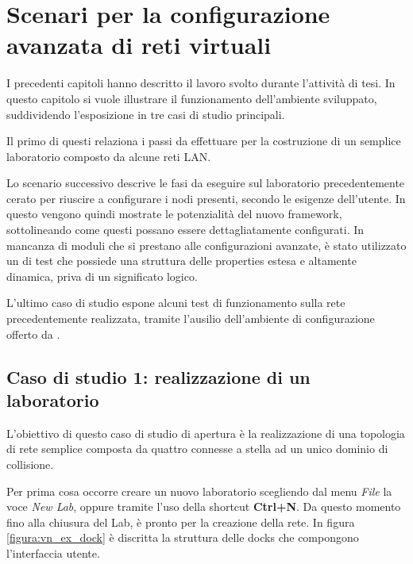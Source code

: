 \chapter{Scenari per la configurazione avanzata di reti virtuali}\label{capitolo:esempi}

I precedenti capitoli hanno descritto il lavoro svolto durante l'attività di tesi. In questo capitolo si vuole illustrare il funzionamento dell'ambiente sviluppato, suddividendo l'esposizione in tre casi di studio principali.

Il primo di questi relaziona i passi da effettuare per la costruzione di un semplice laboratorio composto da alcune reti LAN.

Lo scenario successivo descrive le fasi da eseguire sul laboratorio precedentemente cerato per riuscire a configurare i nodi presenti, secondo le esigenze dell'utente. In questo vengono quindi mostrate le potenzialità del nuovo \plugin{} framework, sottolineando come questi possano essere dettagliatamente configurati. In mancanza di moduli che si prestano alle configurazioni avanzate, è stato utilizzato un \plugin{} di test che possiede una struttura delle properties estesa e altamente dinamica, priva di un significato logico.

L'ultimo caso di studio espone alcuni test di funzionamento sulla rete precedentemente realizzata, tramite l'ausilio dell'ambiente di configurazione offerto da \netkit{}.

\section{Caso di studio 1: realizzazione di un laboratorio}
L'obiettivo di questo caso di studio di apertura è la realizzazione di una topologia di rete semplice composta da quattro \virtualmachine{} connesse a stella ad un unico dominio di collisione.

Per prima cosa occorre creare un nuovo laboratorio scegliendo dal menu \emph{File} la voce \emph{New Lab}, oppure tramite l'uso della shortcut \textbf{Ctrl+N}. Da questo momento fino alla chiusura del Lab, \visualnetkit{} è pronto per la creazione della rete. In figura \ref{figura:vn_ex_dock} è discritta la struttura delle docks che compongono l'interfaccia utente.

